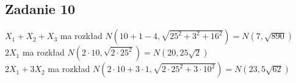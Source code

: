 \subsection{Zadanie 10}
$X_1 + X_2 + X_3$  ma rozkład $N(10+1-4,\sqrt{25^2 + 3^2 + 16^2}) = N(7,\sqrt{890})$ \\
$2X_1$  ma rozkład $N(2 \cdot 10,\sqrt{2 \cdot 25^2}) = N(20,25\sqrt{2})$ \\
$2X_1+3X_2$  ma rozkład $N(2 \cdot 10 + 3 \cdot 1,\sqrt{2 \cdot 25^2 + 3 \cdot 10^2}) = N(23,5\sqrt{62})$ \\
